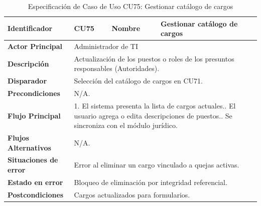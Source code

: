 \begingroup
\setlength{\parskip}{0pt}
\begin{longtable}{|p{3.5cm}|p{2cm}|p{2.5cm}|p{7cm}|}
\caption{Especificación de Caso de Uso CU75: Gestionar catálogo de cargos}
\label{tab:cu75} \\
\hline
\textbf{Identificador} & CU75 & \textbf{Nombre} & Gestionar catálogo de cargos \\ \hline
\textbf{Actor Principal} & \multicolumn{3}{p{11.5cm}|}{Administrador de TI} \\ \hline
\textbf{Descripción} & \multicolumn{3}{p{11.5cm}|}{Actualización de los puestos o roles de los presuntos responsables (Autoridades).} \\ \hline
\textbf{Disparador} & \multicolumn{3}{p{11.5cm}|}{Selección del catálogo de cargos en CU71.} \\ \hline
\textbf{Precondiciones} & \multicolumn{3}{p{11.5cm}|}{N/A.} \\ \hline
\textbf{Flujo Principal} & \multicolumn{3}{p{11.5cm}|}{1. El sistema presenta la lista de cargos actuales.\newline 2. El usuario agrega o edita descripciones de puestos.\newline 3. Se sincroniza con el módulo jurídico.} \\ \hline
\textbf{Flujos Alternativos} & \multicolumn{3}{p{11.5cm}|}{N/A.} \\ \hline
\textbf{Situaciones de error} & \multicolumn{3}{p{11.5cm}|}{Error al eliminar un cargo vinculado a quejas activas.} \\ \hline
\textbf{Estado en error} & \multicolumn{3}{p{11.5cm}|}{Bloqueo de eliminación por integridad referencial.} \\ \hline
\textbf{Postcondiciones} & \multicolumn{3}{p{11.5cm}|}{Cargos actualizados para formularios.} \\ \hline
\end{longtable}
\endgroup

\vspace{0.8cm}

